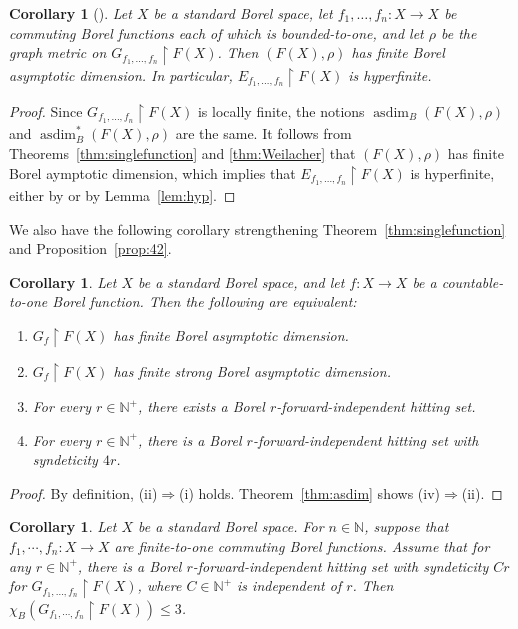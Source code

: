 \documentclass[11pt, reqno, a4paper]{amsart}
\newtheorem{corollary}[theorem]{Corollary}
\theoremstyle{definition}
\theoremstyle{plain}
\begin{document}
\begin{corollary}[{\cite[Theorem 1.6]{NaryshkinShinkoWeilacherYuCommutingFunctions}}] Let $X$ be a standard Borel space,  let $f_1, \dots, f_n\colon X\to X$ be commuting Borel functions each of which is bounded-to-one, and let $\rho$ be the graph metric on $G_{f_1,\dots, f_n}\upharpoonright F(X)$. Then $(F(X), \rho)$ has finite Borel asymptotic dimension. In particular, $E_{f_1,\dots, f_n}\upharpoonright F(X)$ is hyperfinite.
\end{corollary}

\begin{proof} Since $G_{f_1,\dots, f_n}\upharpoonright F(X)$ is locally finite, the notions $\operatorname{asdim}_B(F(X), \rho)$ and $\operatorname{asdim}_B^*(F(X), \rho)$ are the same. It follows from Theorems~\ref{thm:singlefunction} and \ref{thm:Weilacher} that $(F(X), \rho)$ has finite Borel aymptotic dimension, which implies that  $E_{f_1,\dots, f_n}\upharpoonright F(X)$ is hyperfinite, either by \cite[Theorem 7.1]{ConleyJacksonMarksSewardTuckerDrob2023} or by Lemma~\ref{lem:hyp}.
\end{proof}

We also have the following corollary strengthening Theorem~\ref{thm:singlefunction} and Proposition~\ref{prop:42}.

\begin{corollary} Let $X$ be a standard Borel space, and let $f:X\to X$ be a
countable-to-one Borel function. Then the following are equivalent:
\begin{enumerate}[label=(\roman*),leftmargin=2.7em]
\item $G_f\upharpoonright F(X)$ has finite Borel asymptotic dimension.
\item $G_f\upharpoonright F(X)$ has finite strong Borel asymptotic dimension. 
\item For every $r\in\mathbb N^+$, there exists a Borel $r$-forward-independent hitting set. 
\item For every $r\in\mathbb N^+$, there is a Borel $r$-forward-independent hitting set with syndeticity $4r$.
\end{enumerate}
\end{corollary}

\begin{proof} By definition, (ii)$\Rightarrow$(i) holds. Theorem~\ref{thm:asdim} shows (iv)$\Rightarrow$(ii). 
\end{proof}

\begin{corollary}
\label{coro:color}
   Let $X$ be a standard Borel space. For $n\in\mathbb{N}$, suppose that $f_1,\cdots,f_n:X\to X$ are finite-to-one commuting Borel functions. Assume that for any $r\in\mathbb N^+$, there is a Borel $r$-forward-independent hitting set with syndeticity $Cr$ for $G_{f_1,\ldots,f_n}\upharpoonright F(X)$, where $C\in\mathbb N^+$ is independent of $r$. Then $\chi_B(G_{f_1,\cdots,f_n}\upharpoonright F(X))\leq 3$.
\end{corollary}
\end{document}
